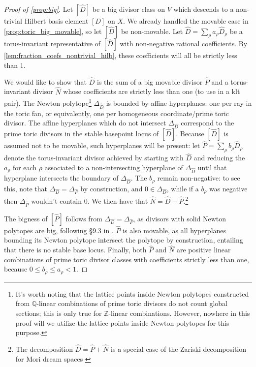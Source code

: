 \documentclass[11pt,dvipsnames]{article}
\theoremstyle{definition}
\begin{document}
\begin{proof}[Proof of \cref{prop:big}]
    Let $[\hat{D}]$ be a big divisor class on $V$ which descends to a non-trivial Hilbert basis element $[D]$ on $X$. We already handled the movable case in \cref{prop:toric_big_movable}, so let $[\hat{D}]$ be non-movable. Let $\hat{D} = \sum_\rho a_\rho \hat{D}_\rho$ be a torus-invariant representative of $[\hat{D}]$ with non-negative rational coefficients. By \cref{lem:fraction_coefs_nontrivial_hilb}, these coefficients will all be strictly less than $1$. 

    We would like to show that $\hat{D}$ is the sum of a big movable divisor $\hat{P}$ and a torus-invariant divisor $\hat{N}$ whose coefficients are strictly less than one (to use in a klt pair). The Newton polytope\footnote{It's worth noting that the lattice points inside Newton polytopes constructed from $\mathbb{Q}$-linear combinations of prime toric divisors do not count global sections; this is only true for $\mathbb{Z}$-linear combinations. However, nowhere in this proof will we utilize the lattice points inside Newton polytopes for this purpose.} $\Delta_{\hat{D}}$ is bounded by affine hyperplanes: one per ray in the toric fan, or equivalently, one per homogeneous coordinate/prime toric divisor. The affine hyperplanes which do not intersect $\Delta_{\hat{D}}$ correspond to the prime toric divisors in the stable basepoint locus of $[\hat{D}]$. Because $[\hat{D}]$ is assumed not to be movable, such hyperplanes will be present: let $\hat{P} = \sum_\rho b_\rho \hat{D}_\rho$ denote the torus-invariant divisor achieved by starting with $\hat{D}$ and reducing the $a_\rho$ for each $\rho$ associated to a non-intersecting hyperplane of $\Delta_{\hat{D}}$ until that hyperplane intersects the boundary of $\Delta_{\hat{D}}$. The $b_\rho$ remain non-negative: to see this, note that $\Delta_{\hat{D}} = \Delta_{\hat{P}}$ by construction, and $0 \in \Delta_{\hat{D}}$, while if a $b_\rho$ was negative then $\Delta_{\hat{P}}$ wouldn't contain $0$. We then have that $\hat{N} = \hat{D} - \hat{P}$.\footnote{The decomposition $\hat{D} = \hat{P} + \hat{N}$ is a special case of the Zariski decomposition for Mori dream spaces \cite{hu2000mori}} 
    
    The bigness of $[\hat{P}]$ follows from $\Delta_{\hat{D}} = \Delta_{\hat{P}}$, as divisors with solid Newton polytopes are big, following \S9.3 in \cite{cls}. $\hat{P}$ is also movable, as all hyperplanes bounding its Newton polytope intersect the polytope by construction, entailing that there is no stable base locus. Finally, both $\hat{P}$ and $\hat{N}$ are positive linear combinations of prime toric divisor classes with coefficients strictly less than one, because $0 \leq b_\rho \leq a_\rho < 1$. 


\end{proof}
\end{document}
